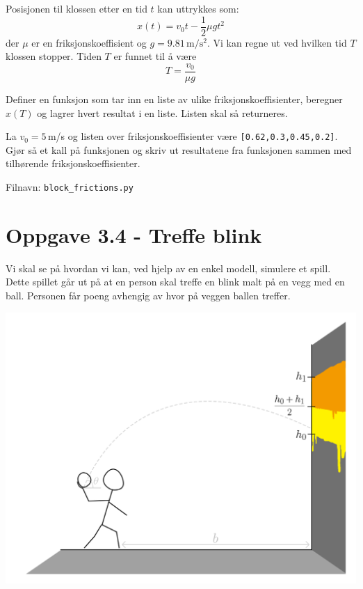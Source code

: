 \documentclass[10pt,a4paper]{article}
\begin{document}
	Posisjonen til klossen etter en tid $t$ kan uttrykkes som:
	\[
		x(t) = v_0t - \frac{1}{2}\mu g t^2
	\]
	der $\mu$ er en friksjonskoeffisient og $g = 9.81\,\mathrm{m/s^2}$.
	Vi kan regne ut ved hvilken tid $T$ klossen stopper. Tiden $T$ er funnet til å være
	\[
	T = \frac{v_0}{\mu g}
	\]
	
	
	Definer en funksjon som tar inn en liste av ulike friksjonskoeffisienter, beregner $x(T)$ og lagrer hvert resultat i en liste.  Listen skal så returneres.
	
	La $v_0 = 5\,$m/s og listen over friksjonskoeffisienter være \texttt{[0.62,0.3,0.45,0.2]}. Gjør så et kall på funksjonen og skriv ut resultatene fra funksjonen sammen med tilhørende friksjonskoeffisienter. 
	
	Filnavn: \texttt{block\_frictions.py}
 
 
 
 
 
	\section*{Oppgave 3.4 - Treffe blink}
	Vi skal se på hvordan vi kan, ved hjelp av en enkel modell, simulere et spill. Dette spillet går ut på at en person skal treffe en blink malt på en vegg med en ball. Personen får poeng avhengig av hvor på veggen ballen treffer.
 
\begin{center}
	\includegraphics[scale=0.75]{fig_tegning_33-cp1.png}
\end{center}
\end{document}
